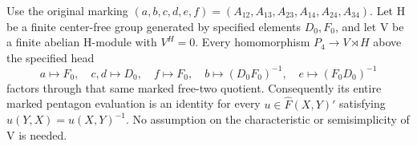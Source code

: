 Use the original marking
\((a,b,c,d,e,f)=(A_{12},A_{13},A_{23},A_{14},A_{24},A_{34})\).
Let H be a finite center-free group generated by specified elements
\(D_0,F_0\), and let V be a finite abelian H-module with \(V^H=0\).
Every homomorphism \(P_4\to V\rtimes H\) above the specified head
\[
 a\mapsto F_0,\quad c,d\mapsto D_0,\quad f\mapsto F_0,
 \quad b\mapsto(D_0F_0)^{-1},\quad e\mapsto(F_0D_0)^{-1}
 \tag{A.95.1}
\]
factors through that same marked free-two quotient. Consequently its
entire marked pentagon evaluation is an identity for every
\(u\in\widehat F(X,Y)'\) satisfying \(u(Y,X)=u(X,Y)^{-1}\).
No assumption on the characteristic or semisimplicity of V is needed.

